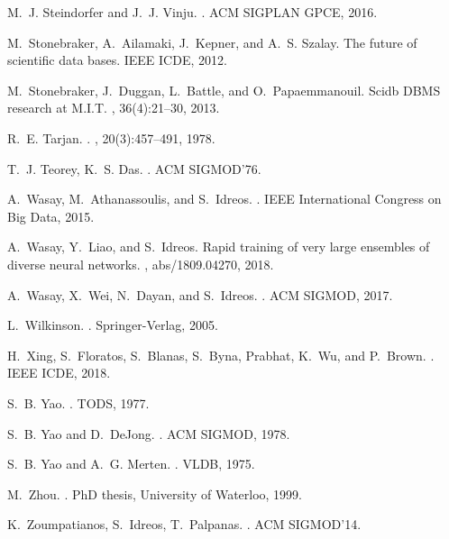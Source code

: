 \documentclass[11pt]{article}
\begin{document}
\begin{thebibliography}{10}
\begin{small}
M.~J. Steindorfer and J.~J. Vinju.
.
\newblock ACM SIGPLAN GPCE, 2016.

M.~Stonebraker, A.~Ailamaki, J.~Kepner, and A.~S. Szalay.
\newblock The future of scientific data bases.
\newblock IEEE ICDE, 2012.

M.~Stonebraker, J.~Duggan, L.~Battle, and O.~Papaemmanouil.
\newblock Scidb {DBMS} research at {M.I.T}.
, 36(4):21--30, 2013.

R.~E. Tarjan.
.
, 20(3):457--491, 1978.

T.~J. Teorey, K.~S. Das.
.
\newblock ACM SIGMOD'76.

A.~Wasay, M.~Athanassoulis, and S.~Idreos.
.
\newblock IEEE International Congress on Big Data, 2015.

A.~Wasay, Y.~Liao, and S.~Idreos.
\newblock Rapid training of very large ensembles of diverse neural networks.
, abs/1809.04270, 2018.

A.~Wasay, X.~Wei, N.~Dayan, and S.~Idreos.
.
\newblock ACM SIGMOD, 2017.

L.~Wilkinson.
.
\newblock Springer-Verlag, 2005.

H.~Xing, S.~Floratos, S.~Blanas, S.~Byna, Prabhat, K.~Wu, and P.~Brown.
.
\newblock IEEE ICDE, 2018.

S.~B. Yao.
.
\newblock TODS, 1977.

S.~B. Yao and D.~DeJong.
.
\newblock ACM SIGMOD, 1978.

S.~B. Yao and A.~G. Merten.
.
\newblock VLDB, 1975.

M.~Zhou.
.
\newblock PhD thesis, University of Waterloo, 1999.

K.~Zoumpatianos, S.~Idreos, T.~Palpanas.
.
\newblock ACM SIGMOD'14.

\end{small} 
\end{thebibliography}
 
\end{document}

